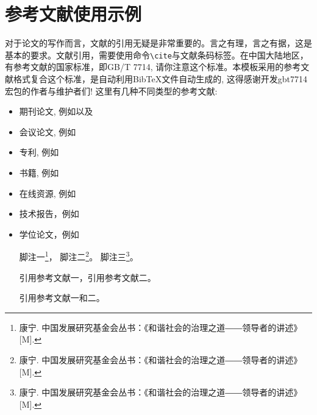 \section{参考文献使用示例}

对于论文的写作而言，文献的引用无疑是非常重要的。言之有理，言之有据，这是基本的要求。文献引用，需要使用命令\verb|\cite|与文献条码标签。在中国大陆地区，有参考文献的国家标准，即GB/T 7714, 请你注意这个标准。本模板采用的参考文献格式复合这个标准，是自动利用BibTeX文件自动生成的, 这得感谢开发gbt7714宏包的作者与维护者们! 这里有几种不同类型的参考文献:

\begin{itemize}
\item[\ding{172}] 期刊论文, 例如\cite{XmDeng2007,Brown1984,ZHY2017RS,ZHY2012manifold}以及\cite{Wing2006CT}
\item[\ding{173}] 会议论文, 例如\cite{Geyer1999,Branislav2004}
\item[\ding{174}] 专利, 例如\cite{LongMA2015P}
\item[\ding{175}] 书籍, 例如\cite{CDIO2014,ZHY2022}
\item[\ding{176}] 在线资源, 例如\cite{SFMedu,OpenMVS,HainnuThesis}
\item[\ding{177}] 技术报告，例如\cite{Sussman2005}
\item[\ding{178}] 学位论文，例如\cite{ZHY2002,Xue2006,lzj-zhy-MS-thesis-2018,zls-zhy-MS-thesis-2016,zhy-2011-disertation}


脚注一\footnote{康宁. 中国发展研究基金会丛书：《和谐社会的治理之道――领导者的讲述》[M].}，
脚注二\footnote{康宁. 中国发展研究基金会丛书：《和谐社会的治理之道――领导者的讲述》[M].}。
脚注三\footnote{康宁. 中国发展研究基金会丛书：《和谐社会的治理之道――领导者的讲述》[M].}。

引用参考文献一\cite{gao1987}，引用参考文献二\cite{zhang1989}。

引用参考文献一和二\cite{gao1987,zhang1989}。


\end{itemize}
